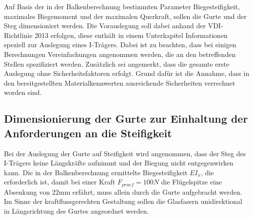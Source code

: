 
Auf Basis der in der Balkenberechnung bestimmten Parameter Biegesteifigkeit, maximales Biegemoment und der maximalen Querkraft, sollen die Gurte und der Steg dimensioniert werden. Die Vorauslegung soll dabei anhand der VDI- Richtlinie 2013 erfolgen, diese enthält in einem Unterkapitel Informationen speziell zur Auslegung eines I-Trägers. Dabei ist zu beachten, dass bei einigen Berechnungen Vereinfachungen angenommen werden, die an den betreffenden Stellen spezifiziert werden. Zusätzlich sei angemerkt, dass die gesamte erste Auslegung ohne Sicherheitsfaktoren erfolgt. Grund dafür ist die Annahme, dass in den bereitgestellten Materialkennwerten ausreichende Sicherheiten verrechnet worden sind.

\subsection{Dimensionierung der Gurte zur Einhaltung der Anforderungen an die Steifigkeit}
Bei der Auslegung der Gurte auf Steifigkeit wird angenommen, dass der Steg des I-Trägers keine Längskräfte aufnimmt und der Biegung nicht entgegenwirken kann. Die in der Balkenberechnung ermittelte Biegesteifigkeit $ EI_{x} $, die erforderlich ist, damit bei einer Kraft $ F_{pruef}=100N $ die Flügelspitze eine Absenkung von 22mm erfährt, muss allein durch die Gurte aufgebracht werden. Im Sinne der kraftflussgerechten Gestaltung sollen die Glasfasern unidirektional in Längsrichtung des Gurtes angeordnet werden.

